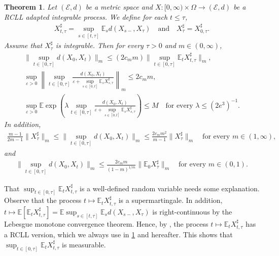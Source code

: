 \documentclass[12pt,oneside,reqno,fleqn]{amsart}
\numberwithin{equation}{section}
\newtheorem{theorem}{Theorem}[section]
\theoremstyle{remark}
\newcommand\cee{{\mathcal E}}
\newcommand\mE{{\mathbb E}}
\newcommand\E{\mE}
\newcommand{\tand}{\quad\text{and}\quad}
\newcommand{\1}{{\mathbf 1}}
\renewcommand{\le}{\leq}
\renewcommand{\ge}{\geq}
\begin{document}
	\begin{theorem}\label{cor.maximaldagger}
		Let $(\cee,d)$ be a metric space and $X:[0,\infty)\times \Omega\to(\cee,d)$ be a RCLL adapted integrable process. We define for each $t\le \tau$,
		\begin{align}\label{def.dagger}
			X^\sharp_{t,\tau}=\sup_{s\in[t,\tau]}\E_sd(X_{s-}, X_\tau)
			\tand X^\sharp_\tau=X^\sharp_{0,\tau}.
		\end{align} 
		Assume that $X^\sharp_\tau$ is integrable. Then for every $\tau>0$ and $m\in(0,\infty)$,
		\begin{gather}
			\label{est.upperbound}
			\|\sup_{t\in[0,\tau]}d(X_0,X_t)\|_m \le(2c_mm)
			\|\sup_{t\in[0,\tau]}\E_tX^\sharp_{t,\tau}\|_m,
			\\
			\sup_{\varepsilon>0}\left\|\sup_{t\in[0,\tau]}\frac{d(X_0,X_t)}{\varepsilon+\sup_{s\in[0,t]}\E_sX^\sharp_{s,\tau}}\right\|_m\le 2c_mm,
			\label{est.X2}
			\\ \sup_{\varepsilon>0}\E\exp\left(\lambda\sup_{t\in[0,\tau]}\frac{d(X_0,X_t)}{\varepsilon+\sup_{s\in[0,t]}\E_sX^\sharp_{s,\tau}}\right)\le M \quad\text{for every } \lambda\le (2e^3)^{-1}.
			\label{est.X3}
		\end{gather}
		In addition, 
		\begin{align}
			\frac{m-1}{2m-1}\|X^\sharp_\tau\|_m\le\|\sup_{t\in[0,\tau]}d(X_0,X_t)\|_m\le \frac{2c_mm^2}{m-1} 
			\|X^\sharp_\tau\|_m \quad \text{for every }m\in(1,\infty),
			\label{est.Smaximal}
		\end{align}
		and
		\begin{align}\label{est.Smax01}
			\|\sup_{t\in[0,\tau]}d(X_0,X_t)\|_m\le \frac{2c_mm}{(1-m)^{1/m}} 
			\|\E_0X^\sharp_\tau\|_m  \quad\text{for every }m\in(0,1).
		\end{align}
	\end{theorem}
	That $\sup_{t\in[0,\tau]}\E_tX^\sharp_{t,\tau}$ is a well-defined random variable needs some explanation. Observe that the process $t\mapsto \E_t X^\sharp_{t,\tau}$ is a supermartingale. In addition, $t\mapsto \E [\E_tX^\sharp_{t,\tau}]=\E\sup_{s\in[t,\tau]}\E_s d(X_{s-},X_\tau)$ is right-continuous by the Lebesgue monotone convergence theorem. Hence, by \cite[Chapter II (2.9)]{MR1725357}, the process $t\mapsto \E_t X^\sharp_{t,\tau}$ has a RCLL version, which we always use in \cref{cor.maximaldagger} and hereafter.
	This shows that $\sup_{t\in[0,\tau]}\E_tX^\sharp_{t,\tau}$ is measurable.
\end{document}
